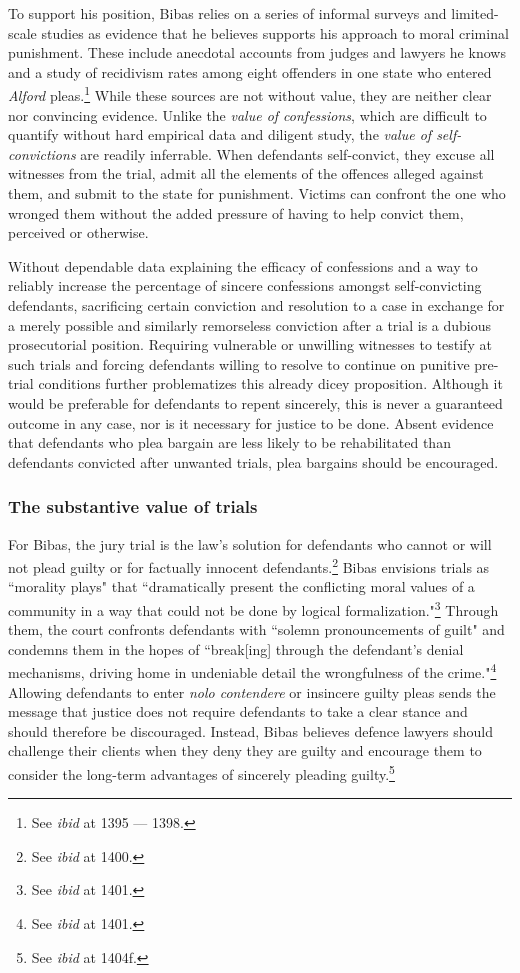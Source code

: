 To support his position, Bibas relies on a series of informal surveys and limited-scale studies as evidence that he believes supports his approach to moral criminal punishment. These include anecdotal accounts from judges and lawyers he knows and a study of recidivism rates among eight offenders in one state who entered \textit{Alford} pleas.\footnote{See \textit{ibid} at 1395 — 1398.} While these sources are not without value, they are neither clear nor convincing evidence. Unlike the \textit{value of confessions}, which are difficult to quantify without hard empirical data and diligent study, the \textit{value of self-convictions} are readily inferrable. When defendants self-convict, they excuse all witnesses from the trial, admit all the elements of the offences alleged against them, and submit to the state for punishment. Victims can confront the one who wronged them without the added pressure of having to help convict them, perceived or otherwise. 

Without dependable data explaining the efficacy of confessions and a way to reliably increase the percentage of sincere confessions amongst self-convicting defendants, sacrificing certain conviction and resolution to a case in exchange for a merely possible and similarly remorseless conviction after a trial is a dubious prosecutorial position. Requiring vulnerable or unwilling witnesses to testify at such trials and forcing defendants willing to resolve to continue on punitive pre-trial conditions further problematizes this already dicey proposition. Although it would be preferable for defendants to repent sincerely, this is never a guaranteed outcome in any case, nor is it necessary for justice to be done. Absent evidence that defendants who plea bargain are less likely to be rehabilitated than defendants convicted after unwanted trials, plea bargains should be encouraged.

\subsubsection{The substantive value of trials}

For Bibas, the jury trial is the law's solution for defendants who cannot or will not plead guilty or for factually innocent defendants.\footnote{See \textit{ibid} at 1400.} Bibas envisions trials as ``morality plays" that ``dramatically present the conflicting moral values of a community in a way that could not be done by logical formalization."\footnote{See \textit{ibid} at 1401.} Through them, the court confronts defendants with ``solemn pronouncements of guilt" and condemns them in the hopes of ``break[ing] through the defendant's denial mechanisms, driving home in undeniable detail the wrongfulness of the crime."\footnote{See \textit{ibid} at 1401.} Allowing defendants to enter \textit{nolo contendere} or insincere guilty pleas sends the message that justice does not require defendants to take a clear stance and should therefore be discouraged. Instead, Bibas believes defence lawyers should challenge their clients when they deny they are guilty and encourage them to consider the long-term advantages of sincerely pleading guilty.\footnote{See \textit{ibid} at 1404f.}

